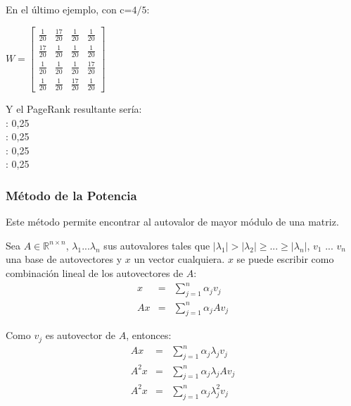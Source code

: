 \documentclass[a4paper]{article}
\begin{document}
En el último ejemplo, con c=$4/5$:
\begin{center}
$W=\begin{bmatrix} \frac{1}{20}&\frac{17}{20}&\frac{1}{20}&\frac{1}{20}\\\frac{17}{20}&\frac{1}{20}&\frac{1}{20}&\frac{1}{20}\\ \frac{1}{20}&\frac{1}{20}&\frac{1}{20}&\frac{17}{20}\\\frac{1}{20}&\frac{1}{20}&\frac{17}{20}&\frac{1}{20}\end{bmatrix}$
\end{center}

Y el PageRank resultante sería: \\

: 0,25 \\
: 0,25 \\
: 0,25 \\
: 0,25 \\

\subsubsection{M\'{e}todo de la Potencia}

Este método permite encontrar al autovalor de mayor módulo de una matriz.

Sea $A \in \mathbb{R}^{n \times n}$, $\lambda_1 ... \lambda_n$ sus autovalores tales que $|\lambda_1|>|\lambda_2| \geq ... \geq |\lambda_n|$, $v_1$ ... $v_n$ una base de autovectores
y $x$ un vector cualquiera. $x$ se puede escribir como combinación lineal de los autovectores de $A$:
\begin{eqnarray*}
x & = &\sum_{j=1}^{n} \alpha_j v_j\\
Ax & = &\sum_{j=1}^{n} \alpha_j Av_j
\end{eqnarray*}

Como $v_j$ es autovector de $A$, entonces:
\begin{eqnarray*}
Ax&=&\sum_{j=1}^{n} \alpha_j \lambda_j v_j\\
A^2x&=&\sum_{j=1}^{n} \alpha_j \lambda_j Av_j\\
A^2x&=&\sum_{j=1}^{n} \alpha_j \lambda^2_j v_j
\end{eqnarray*}
\end{document}
